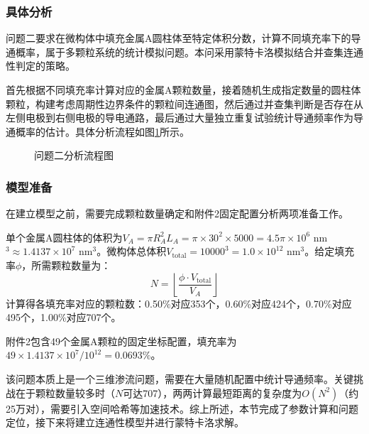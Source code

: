 
\subsubsection{具体分析}

问题二要求在微构体中填充金属A圆柱体至特定体积分数，计算不同填充率下的导通概率，属于多颗粒系统的统计模拟问题。本问采用蒙特卡洛模拟结合并查集连通性判定的策略。

首先根据不同填充率计算对应的金属A颗粒数量，接着随机生成指定数量的圆柱体颗粒，构建考虑周期性边界条件的颗粒间连通图，然后通过并查集判断是否存在从左侧电极到右侧电极的导电通路，最后通过大量独立重复试验统计导通频率作为导通概率的估计。具体分析流程如图\ref{fig:analysis2_flow}所示。

\begin{figure}[ht]
  \begin{center}
    \caption{问题二分析流程图}
    \label{fig:analysis2_flow}
  \end{center}
\end{figure}

\subsubsection{模型准备}

在建立模型之前，需要完成颗粒数量确定和附件2固定配置分析两项准备工作。

单个金属A圆柱体的体积为$V_A = \pi R_A^2 L_A = \pi \times 30^2 \times 5000 = 4.5\pi \times 10^6$ nm$^3 \approx 1.4137 \times 10^7$ nm$^3$。微构体总体积$V_{\text{total}} = 10000^3 = 1.0 \times 10^{12}$ nm$^3$。给定填充率$\phi$，所需颗粒数量为：
\begin{equation}
N = \left\lfloor \frac{\phi \cdot V_{\text{total}}}{V_A} \right\rfloor
\end{equation}
计算得各填充率对应的颗粒数：0.50\%对应353个，0.60\%对应424个，0.70\%对应495个，1.00\%对应707个。

附件2包含49个金属A颗粒的固定坐标配置，填充率为$49 \times 1.4137 \times 10^7 / 10^{12} = 0.0693\%$。

该问题本质上是一个三维渗流问题，需要在大量随机配置中统计导通频率。关键挑战在于颗粒数量较多时（$N$可达707），两两计算最短距离的复杂度为$O(N^2)$（约25万对），需要引入空间哈希等加速技术。综上所述，本节完成了参数计算和问题定位，接下来将建立连通性模型并进行蒙特卡洛求解。

